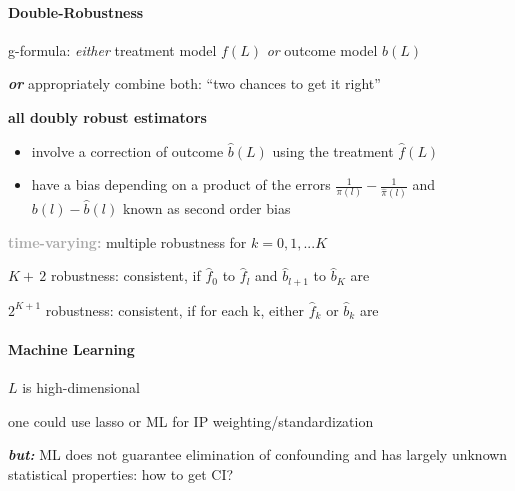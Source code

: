 \documentclass[8pt,twoside]{extarticle}
\begin{document}
\begin{multicols}{2}



\paragraph{Double-Robustness} \citep{hernan2023causal}

\noindent g-formula: \textit{either} treatment model $f(L)$  \textit{or} outcome model $b(L)$ 

\noindent \textit{\textbf{or}} appropriately combine both: ``two chances to get it right''

\noindent \textbf{all doubly robust estimators} 
\begin{itemize}[leftmargin=*, itemsep=0em, topsep=0pt, partopsep=0pt,parsep=0pt]
\item involve a correction of  outcome $\hat{b}(L)$ using the treatment $\hat{f}(L)$
\item have a bias depending on a product of the errors $\frac{1}{\pi(l)} - \frac{1}{\hat{\pi}(l)}$ and $b(l) - \hat{b}(l)$ known as second order bias 
\end{itemize}

\vspace{0.2em}
\noindent \colorbox{lightgray!20!white}{\begin{minipage}{28em}

\textbf{\textcolor{darkgray}{time-varying:}} 
  multiple robustness for $k=0,1,...K$
  
 $K{+}\,2$ robustness: consistent, if $\hat{f}_0$ to $\hat{f}_l$ and $\hat{b}_{l+1}$ to $\hat{b}_K$ are 
 
 $2^{K{+}1}$ robustness: consistent, if for each k, either  $\hat{f}_k$ or $\hat{b}_k$ are
  
  \end{minipage}}

\paragraph{Machine Learning} $L$ is high-dimensional

\noindent one could use lasso or ML for IP weighting/standardization

\noindent \textbf{\textit{but:}} ML does not guarantee elimination of confounding and has largely unknown statistical properties: how to get CI?


\end{multicols}
\end{document}
